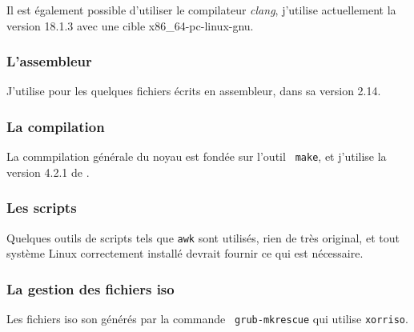    Il est également possible d'utiliser le compilateur \emph{clang},
j'utilise actuellement la version 18.1.3 avec une cible
x86\_64-pc-linux-gnu.

%
\subsubsection{L'assembleur}

   J'utilise \nasm \autocite{nasm-website}  pour les quelques fichiers
écrits en assembleur, dans sa version 2.14.
 
%
\subsubsection{La compilation}
\label{subection:compilation}

   La commpilation générale du noyau est fondée sur l'outil {\tt
make}, et j'utilise la version 4.2.1 de .

%
\subsubsection{Les scripts}

   Quelques outils de scripts tels que {\tt awk} sont utilisés, rien
de très original, et tout système Linux correctement installé devrait
fournir ce qui est nécessaire.

%
\subsubsection{La gestion des fichiers {\sc iso}}

   Les fichiers {\sc iso} son générés par la commande {\tt
     grub-mkrescue} qui utilise {\tt xorriso}.
   
%
